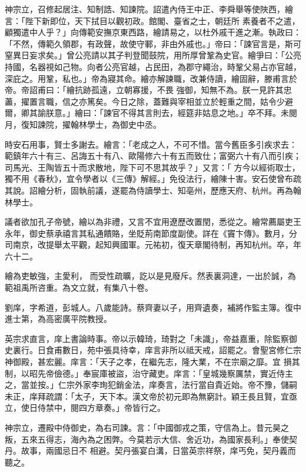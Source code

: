 \begin{pinyinscope}
 神宗立，召修起居注、知制誥、知諫院。詔遣內侍王中正、李舜舉等使陜西，繪言：「陛下新即位，天下拭目以觀初政。館閣、臺省之士，朝廷所
 素養者不之遣，顧獨遣中人乎？」向傳範安撫京東西路，繪請易之，以杜外戚干進之漸。執政曰：「不然，傳範久領郡，有政聲，故使守鄆，非由外戚也。」帝曰：「諫官言是，斯可窒異日妄求矣。」曾公亮請以其子判登聞鼓院，用所厚曾鞏為史官。繪爭曰：「公亮持國，名器視如己物。向者公亮官越，占民田，為郡守繩治，時鞏父易占亦官越，深庇之。用鞏，私也。」帝為寢其命。繪亦解諫職，改兼侍讀，繪固辭，滕甫言於帝。帝詔甫曰：「繪抗跡孤遠，立朝寡援，不畏
 強御，知無不為。朕一見許其忠藎，擢置言職，信之亦篤矣。今日之除，蓋難與宰相並立於輕重之間，姑令少避爾，卿其諭朕意。」繪曰：「諫官不得其言則去，經筵非姑息之地。」卒不拜。未閱月，復知諫院，擢翰林學士，為御史中丞。



 時安石用事，賢士多謝去。繪言：「老成之人，不可不惜。當今舊臣多引疾求去：範鎮年六十有三、呂誨五十有八、歐陽修六十有五而致仕；富弼六十有八而引疾；司馬光、王陶皆五十而求散地，陛下可不思其故乎？」又言：「
 方今以經術取士，獨不用《春秋》，宜令學者以《三傳》解經。」免役法行，繪陳十害。安石使曾布疏其說。詔繪分析，固執前議，遂罷為侍讀學士、知亳州，歷應天府、杭州。再為翰林學士。



 議者欲加孔子帝號，繪以為非禮，又言不宜用遼歷改置閏，悉從之。繪常薦屬吏王永年，御史蔡承禧言其私通饋賂，坐貶荊南節度副使。詳在《竇卞傳》。數月，分司南京，改提舉太平觀，起知興國軍。元祐初，復天章閣待制，再知杭州。卒，年六十二。



 繪為吏敏強，主愛利，
 而受性疏曠，訖以是見廢斥。然表裏洞達，一出於誠，為範祖禹所咨重。為文立就，有集八十卷。



 劉庠，字希道，彭城人。八歲能詩。蔡齊妻以子，用齊遺奏，補將作監主簿。復中進士第，為高密廣平院教授。



 英宗求直言，庠上書論時事。帝以示韓琦，琦對之「未識」，帝益嘉重，除監察御史裏行。日食甫數日，苑中張具待幸，庠言非所以祗天戒，詔罷之。會聖宮修仁宗神御殿，甚宏麗。庠言：「天子之孝，在繼先志，隆大業，不在宗廟之靡。宜
 損其制，以昭先帝儉德。」奉宸庫被盜，治守藏吏。庠言：「皇城幾察厲禁，實近侍主之，當並按。」仁宗外家李珣犯銷金法，庠奏言，法行當自貴近始。帝不豫，儲嗣未正，庠拜疏謂：「太子，天下本。漢文帝於初元即為無窮計。穎王長且賢，宜亟立，使日侍禁中，閱四方章奏。」帝皆行之。



 神宗立，遷殿中侍御史，為右司諫。言：「中國御戎之策，守信為上。昔元昊之叛，五來五得志，海內為之困弊。今莫若示大信、舍近功，為國家長利。」奉使契丹。故事，兩國忌日不
 相避。契丹張宴白溝，日當英宗祥祭，庠丐免，契丹義而聽之。




\end{pinyinscope}
